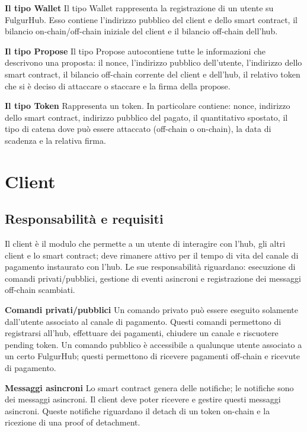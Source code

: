 \documentclass[12pt,italian,]{book}
\begin{document}
\textbf{\textbf{Il tipo Wallet}} Il tipo Wallet rappresenta la registrazione di un utente su FulgurHub. Esso contiene l'indirizzo pubblico del client e dello smart contract, il bilancio on-chain/off-chain iniziale del client e il bilancio off-chain dell'hub.

\textbf{\textbf{Il tipo Propose}} Il tipo Propose autocontiene tutte le informazioni che descrivono una proposta: il nonce, l'indirizzo pubblico dell'utente, l'indirizzo dello smart contract, il bilancio off-chain corrente del client e dell'hub, il relativo token che si è deciso di attaccare o staccare e la firma della propose.

\textbf{\textbf{Il tipo Token}} Rappresenta un token. In particolare contiene: nonce, indirizzo dello smart contract, indirizzo pubblico del pagato, il quantitativo spostato, il tipo di catena dove può essere attaccato (off-chain o on-chain), la data di scadenza e la relativa firma.

\hypertarget{client}{%
\section{Client}\label{client}}

\hypertarget{responsabilituxe0-e-requisiti}{%
\subsection{Responsabilità e requisiti}\label{responsabilituxe0-e-requisiti}}

Il client è il modulo che permette a un utente di interagire con l'hub, gli altri client e lo smart contract; deve rimanere attivo per il tempo di vita del canale di pagamento instaurato con l'hub. Le sue responsabilità riguardano: esecuzione di comandi privati/pubblici, gestione di eventi asincroni e registrazione dei messaggi off-chain scambiati.

\textbf{\textbf{Comandi privati/pubblici}} Un comando privato può essere eseguito solamente dall'utente associato al canale di pagamento. Questi comandi permettono di registrarsi all'hub, effettuare dei pagamenti, chiudere un canale e riscuotere pending token. Un comando pubblico è accessibile a qualunque utente associato a un certo FulgurHub; questi permettono di ricevere pagamenti off-chain e ricevute di pagamento.

\textbf{\textbf{Messaggi asincroni}} Lo smart contract genera delle notifiche; le notifiche sono dei messaggi asincroni. Il client deve poter ricevere e gestire questi messaggi asincroni. Queste notifiche riguardano il detach di un token on-chain e la ricezione di una proof of detachment.
\end{document}
